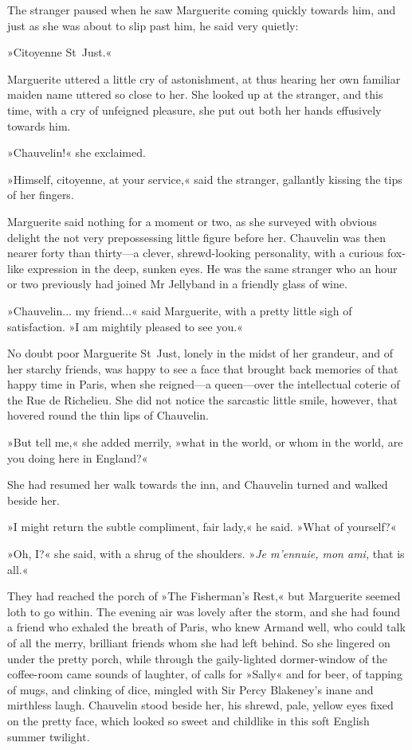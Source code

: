 The stranger paused when he saw Marguerite coming quickly towards him, and just as she was about to slip past him, he said very quietly:

»Citoyenne St~Just.«

Marguerite uttered a little cry of astonishment, at thus hearing her own familiar maiden name uttered so close to her. She looked up at the stranger, and this time, with a cry of unfeigned pleasure, she put out both her hands effusively towards him.

»Chauvelin!« she exclaimed.

»Himself, citoyenne, at your service,« said the stranger, gallantly kissing the tips of her fingers.

Marguerite said nothing for a moment or two, as she surveyed with obvious delight the not very prepossessing little figure before her. Chauvelin was then nearer forty than thirty\allowbreak---\allowbreak a clever, shrewd-looking personality, with a curious fox-like expression in the deep, sunken eyes. He was the same stranger who an hour or two previously had joined Mr Jellyband in a friendly glass of wine.

»Chauvelin... my friend...« said Marguerite, with a pretty little sigh of satisfaction. »I am mightily pleased to see you.«

No doubt poor Marguerite St~Just, lonely in the midst of her grandeur, and of her starchy friends, was happy to see a face that brought back memories of that happy time in Paris, when she reigned\allowbreak---\allowbreak a queen\allowbreak---\allowbreak over the intellectual coterie of the Rue de Richelieu. She did not notice the sarcastic little smile, however, that hovered round the thin lips of Chauvelin.

»But tell me,« she added merrily, »what in the world, or whom in the world, are you doing here in England?«

She had resumed her walk towards the inn, and Chauvelin turned and walked beside her.

»I might return the subtle compliment, fair lady,« he said. »What of yourself?«

»Oh, I?« she said, with a shrug of the shoulders. »\textit{Je m'ennuie, mon ami,} that is all.«

They had reached the porch of »The Fisherman's Rest,« but Marguerite seemed loth to go within. The evening air was lovely after the storm, and she had found a friend who exhaled the breath of Paris, who knew Armand well, who could talk of all the merry, brilliant friends whom she had left behind. So she lingered on under the pretty porch, while through the gaily-lighted dormer-window of the coffee-room came sounds of laughter, of calls for »Sally« and for beer, of tapping of mugs, and clinking of dice, mingled with Sir Percy Blakeney's inane and mirthless laugh. Chauvelin stood beside her, his shrewd, pale, yellow eyes fixed on the pretty face, which looked so sweet and childlike in this soft English summer twilight.

